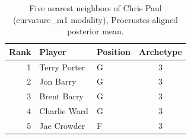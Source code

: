 \begin{table}[htbp]
  \centering\small
  \begin{tabular}{rllc}
    \toprule
    Rank & Player & Position & Archetype \\
    \midrule
    1 & Terry Porter & G & 3 \\
    2 & Jon Barry & G & 3 \\
    3 & Brent Barry & G & 3 \\
    4 & Charlie Ward & G & 3 \\
    5 & Jae Crowder & F & 3 \\
    \bottomrule
  \end{tabular}
  \caption{Five nearest neighbors of Chris Paul (curvature_m1 modality), Procrustes-aligned posterior mean.}
  \label{tab:Chris_Paul_neighbors_curvature_m1}
\end{table}

